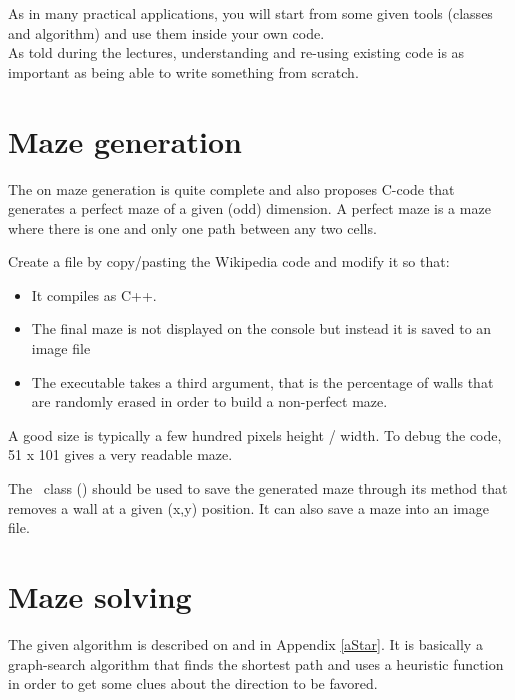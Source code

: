 \documentclass{ecnreport}
\def\maze{\okt{ecn::Maze}~}
\begin{document}
As in many practical applications, you will start from some given tools (classes and algorithm) and use them inside your own code.\\
As told during the lectures, understanding and re-using existing code is as important as being able to write something from scratch.

\section{Maze generation}

The  on maze generation is quite complete
and also proposes C-code that generates a perfect maze of a given (odd) dimension. A perfect maze is a maze where there is one and only 
one path between any two cells.

Create a  file by copy/pasting the Wikipedia code and modify it so that:
\begin{itemize}
 \item It compiles as C++.
 \item The final maze is not displayed on the console but instead it is saved to an image file 
 \item The executable takes a third argument, that is the percentage of walls that are randomly erased in order to build a non-perfect maze.
\end{itemize}
A good size is typically a few hundred pixels height / width. To debug the code, 51 x 101 gives a very readable maze.

The \maze class () should be used to save the generated maze through its  method that removes a wall at a given (x,y) position.
It can also save a maze into an image file.


\section{Maze solving}

The given algorithm is described on  and in Appendix \ref{aStar}. It is basically a graph-search algorithm that
finds the shortest path and uses a heuristic function in order to get some clues about the direction to be favored.
\end{document}
